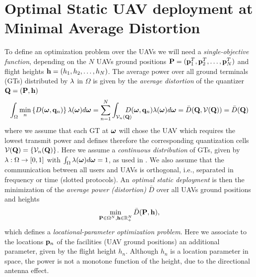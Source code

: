 \documentclass[smallabstract,smallcaptions]{dccpaper}
\newcommand{\df}{\ensuremath{\lam}}         %
\newcommand{\bH}{\ensuremath{\vh}}          %
\newcommand{\Vor}{\ensuremath{\mathcal{V}}}         %
\newcommand{\Dis}{\ensuremath{D}}                    %
\newcommand{\AvDis}{\ensuremath{\bar{\Dis}}}         %
\begin{document}
\section{Optimal Static UAV deployment at Minimal Average Distortion}

To define an optimization problem over the UAVs we will need a \emph{single-objective function}, depending   
on the $N$ UAVs ground positions $\mathbf P =({\mathbf p}_1^T,{\mathbf p}_2^T,\dots,{\mathbf p}^T_N)$ and flight heights
${\mathbf h}=(h_1,h_2,\dots,h_N)$.  The average power over all ground terminals (GTs)
distributed by $\df$ in $\Omega$ is given by the \emph{average distortion} of the quantizer $\mathbf Q=(\mathbf P ,{\mathbf h})$
%
\begin{equation}
 \int_{\Omega}\min_{n} \left\{ \Dis(\vome,\vq_n) \right\} \df(\vome)d\vome = \sum_{n=1}^N \int_{\Vor_n(\vQ)} \!\!\!\!\!\!\!D(\vome,\vq_n)\lam(\vome)d\vome=\AvDis(\vQ,\Vor(\vQ))=\AvDis(\vQ)
  \label{eq:Pbar}
\end{equation}
%
where we assume that each GT at $\boldsymbol{ \omega}$ will chose the UAV which requires the lowest transmit power and defines therefore the corresponding quantization cells $\Vor(\vQ)=\{\Vor_n(\vQ)\}$.
Here  we assume a \emph{continuous distribution} of GTs, given by $\df:\Ome\to[0,1]$ with $\int_{\Omega}\df(\vome)d\vome=1$, as
used in \cite{GJ,Erdem1,ML,MLCS}.  We also assume that the
communication between all users and UAVs is orthogonal, i.e., separated in frequency or time (slotted protocols). An
\emph{optimal static deployment} is then the minimization of the \emph{average power (distortion)} $\AvDis$ over all UAVs ground positions and heights
\begin{align}
  \min_{\vP\in\Omega^N, \bH\in\R_+^{N}} \AvDis(\vP,\bH)\label{eq:optPbar},
\end{align}
%
which defines a \emph{locational-parameter optimization problem}.
Here we associate to the locations ${\mathbf p}_n$ of the facilities (UAV ground positions) an additional parameter, given by the
flight height $h_n$.  Although $h_n$ is a location parameter in space, the power is not a monotone function of the
height, due to the directional antenna effect.  


%
\end{document}

